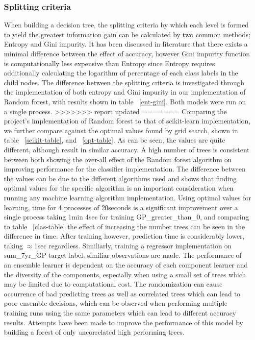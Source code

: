 \documentclass{article} %
\begin{document}
\subsubsection{Splitting criteria}

When building a decision tree, the splitting criteria by which each level is formed to yield the greatest information gain can be calculated by two common methods; Entropy and Gini impurity. It has been discussed in literature that there exists a minimal difference between the effect of accuracy, however Gini impurity function is computationally less expensive than Entropy since Entropy requires additionally calculating the logarithm of percentage of each class labels in the child nodes. The difference between the splitting criteria is investigated through the implementation of both entropy and Gini impurity in our implementation of Random forest, with results shown in table ~\ref{ent-gini}. Both models were run on a single process.
>>>>>>> report updated
=======
Comparing the project's implementation of Random forest to that of scikit-learn implementation, we further compare against the optimal values found by grid search, shown in table ~\ref{scikit-table}, and ~\ref{opt-table}. As can be seen, the values are quite different, although result in similar accuracy. A high number of trees is consistent between both showing the over-all effect of the Random forest algorithm on improving performance for the classifier implementation. The difference between the values can be due to the different algorithms used and shows that finding optimal values for the specific algorithm is an important consideration when running any machine learning algorithm implementation. Using optimal values for learning, time for 4 processes of 20seconds is a significant improvement over a single process taking 1min 4sec for training GP\_greater\_than\_0, and comparing to table ~\ref{clas-table} the effect of increasing the number trees can be seen in the difference in time. After training however, prediction time is considerably lower, taking $\approx$1sec regardless. Similiarly, training a regressor implementation on sum\_7yr\_GP target label, similiar observations are made. The performance of an ensemble learner is dependent on the accuracy of each component learner and the diversity of the components, especially when using a small set of trees which may be limited due to computational cost. The randomization can cause occurrence of bad predicting trees as well as correlated trees which can lead to poor ensemble decisions, which can be observed when performing multiple training runs using the same parameters which can lead to different accuracy results. Attempts have been made to improve the performance of this model by building a forest of only uncorrelated high performing trees. \cite{Bharathidason2014}
\end{document}
